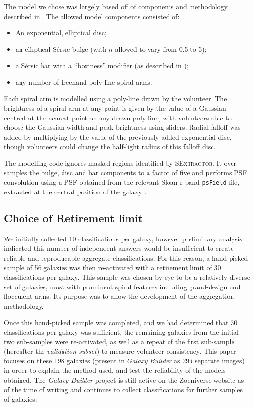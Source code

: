 \documentclass[../main.tex]{subfiles}
\begin{document}
The model we chose was largely based off of components and methodology described in \citet{galfit-paper}. The allowed model components consisted of:
\begin{itemize}
\item An exponential, elliptical disc;
\item an elliptical S\'ersic bulge (with $n$ allowed to vary from 0.5 to 5);
\item a S\'ersic bar with a ``boxiness'' modifier (as described in \citealt{galfit-paper});
\item any number of freehand poly-line spiral arms.
\end{itemize}

Each spiral arm is modelled using a poly-line drawn by the volunteer. The brightness of a spiral arm at any point is given by the value of a Gaussian centred at the nearest point on any drawn poly-line, with volunteers able to choose the Gaussian width and peak brightness using sliders. Radial falloff was added by multiplying by the value of the previously added exponential disc, though volunteers could change the half-light radius of this falloff disc.

The modelling code ignores masked regions identified by \textsc{SExtractor}. It over-samples the bulge, disc and bar components to a factor of five and performs PSF convolution using a PSF obtained from the relevant Sloan r-band \texttt{psField} file, extracted at the central position of the galaxy \citep{2002AJ....123..485S}.

\subsection{Choice of Retirement limit}
\label{sec:retirement-limit}

We initially collected 10 classifications per galaxy, however preliminary analysis indicated this number of independent answers would be insufficient to create reliable and reproducable aggregate classifications. For this reason, a hand-picked sample of 56 galaxies was then re-activated with a retirement limit of 30 classifications per galaxy. This sample was chosen by eye to be a relatively diverse set of galaxies, most with prominent spiral features including grand-design and flocculent arms. Its purpose was to allow the development of the aggregation methodology.

Once this hand-picked sample was completed, and we had determined that 30 classifications per galaxy was sufficient, the remaining galaxies from the initial two sub-samples were re-activated, as well as a repeat of the first sub-sample (hereafter the \textit{validation subset}) to measure volunteer consistency. This paper focuses on these 198 galaxies (present in \textit{Galaxy Builder} as 296 separate images) in order to explain the method used, and test the reliability of the models obtained. The \textit{Galaxy Builder} project is still active on the Zooniverse website as of the time of writing and continues to collect classifications for further samples of galaxies.
\end{document}
